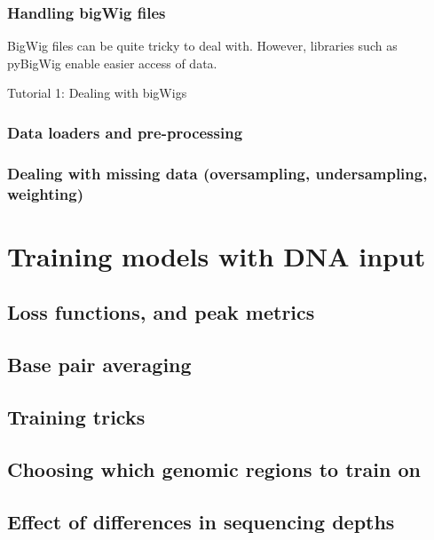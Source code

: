 \documentclass[
]{book}
\begin{document}
\section{Handling bigWig files}\label{handling-bigwig-files}

BigWig files can be quite tricky to deal with. However, libraries such as pyBigWig enable easier access of data.

Tutorial 1: Dealing with bigWigs

\section{Data loaders and pre-processing}\label{data-loaders-and-pre-processing}

\section{Dealing with missing data (oversampling, undersampling, weighting)}\label{dealing-with-missing-data-oversampling-undersampling-weighting}

\part{Training models with DNA input}\label{part-training-models-with-dna-input}

\chapter{Loss functions, and peak metrics}\label{loss-functions-and-peak-metrics}

\chapter{Base pair averaging}\label{base-pair-averaging}

\chapter{Training tricks}\label{training-tricks}

\chapter{Choosing which genomic regions to train on}\label{choosing-which-genomic-regions-to-train-on}

\chapter{Effect of differences in sequencing depths}\label{effect-of-differences-in-sequencing-depths}
\end{document}
